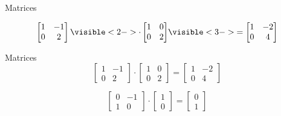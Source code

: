 \documentclass[10pt]{beamer}
\begin{document}
\iffalse

\begin{frame}{Matrices}





\[
\begin{bmatrix}
    1  &  -1      \\
    0  &  2      
\end{bmatrix}
\visible<2->{\cdot
\begin{bmatrix}
    1  &  0      \\
    0  &  2      
\end{bmatrix} }
\visible<3->{=
\begin{bmatrix}
    1  &  -2      \\
    0  &  4      
\end{bmatrix} }
\]


\end{frame}

\begin{frame}{Matrices}
\[
\begin{bmatrix}
    1  &  -1      \\
    0  &  2      
\end{bmatrix}
\cdot
\begin{bmatrix}
    1  &  0      \\
    0  &  2      
\end{bmatrix}
 =
\begin{bmatrix}
    1  &  -2      \\
    0  &  4      
\end{bmatrix}
\] 

\[
\begin{bmatrix}
    0  &  -1      \\
    1  &  0      
\end{bmatrix}
\cdot
\begin{bmatrix}
      1      \\
      0      
\end{bmatrix}
=
\begin{bmatrix}
    0        \\
    1        
\end{bmatrix}
\]

\end{frame}
\end{document}
